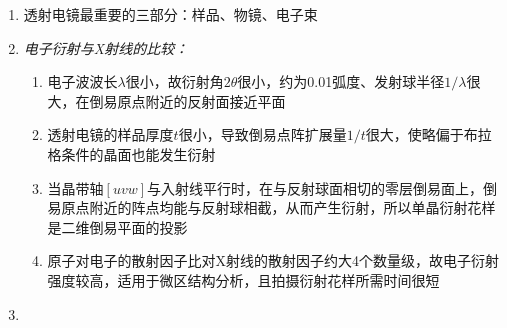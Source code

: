 \documentclass[12pt,a4paper]{article}
\begin{document}
\begin{enumerate}
        \item 透射电镜最重要的三部分：样品、物镜、电子束
        \item  \em 电子衍射与X射线的比较：
        \begin{enumerate}
            \item 电子波波长$\lambda$很小，故衍射角$2\theta$很小，约为0.01弧度、发射球半径$1/\lambda$很大，在倒易原点附近的反射面接近平面
            \item 透射电镜的样品厚度$t$很小，导致倒易点阵扩展量$1/t$很大，使略偏于布拉格条件的晶面也能发生衍射
            \item 当晶带轴$[uvw]$与入射线平行时，在与反射球面相切的零层倒易面上，倒易原点附近的阵点均能与反射球相截，从而产生衍射，所以单晶衍射花样是二维倒易平面的投影
            \item 原子对电子的散射因子比对X射线的散射因子约大4个数量级，故电子衍射强度较高，适用于微区结构分析，且拍摄衍射花样所需时间很短
        \end{enumerate}
                \em
        \item 
    \end{enumerate}
\end{document}
